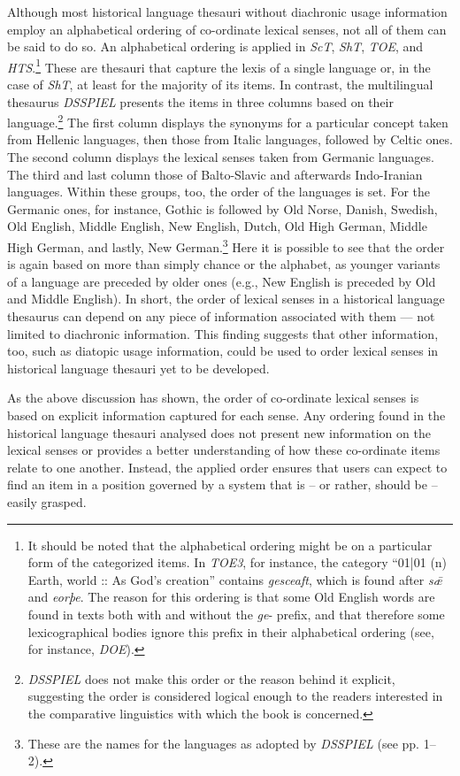 Although most historical language thesauri without diachronic usage information employ an alphabetical ordering of co-ordinate lexical senses, not all of them can be said to do so. An alphabetical ordering is applied in \textit{ScT}, \textit{ShT}, \textit{TOE}, and \textit{HTS}.\footnote{It should be noted that the alphabetical ordering might be on a particular form of the categorized items. In \textit{TOE3}, for instance, the category ``01|01 (n) Earth, world :: As God's creation'' contains \textit{gesceaft}, which is found after \textit{sǣ} and \textit{eorþe}. The reason for this ordering is that some Old English words are found in texts both with and without the \textit{ge}- prefix, and that therefore some lexicographical bodies ignore this prefix in their alphabetical ordering (see, for instance, \textit{DOE}).} These are thesauri that capture the lexis of a single language or, in the case of \textit{ShT}, at least for the majority of its items. In contrast, the multilingual thesaurus \textit{DSSPIEL} presents the items in three columns based on their language.\footnote{\textit{DSSPIEL} does not make this order or the reason behind it explicit, suggesting the order is considered logical enough to the readers interested in the comparative linguistics with which the book is concerned.} The first column displays the synonyms for a particular concept taken from Hellenic languages, then those from Italic languages, followed by Celtic ones. The second column displays the lexical senses taken from Germanic languages. The third and last column those of Balto-Slavic and afterwards Indo-Iranian languages. Within these groups, too, the order of the languages is set. For the Germanic ones, for instance, Gothic is followed by Old Norse, Danish, Swedish, Old English, Middle English, New English, Dutch, Old High German, Middle High German, and lastly, New German.\footnote{These are the names for the languages as adopted by \textit{DSSPIEL} (see pp. 1–2).} Here it is possible to see that the order is again based on more than simply chance or the alphabet, as younger variants of a language are preceded by older ones (e.g., New English is preceded by Old and Middle English). In short, the order of lexical senses in a historical language thesaurus can depend on any piece of information associated with them --- not limited to diachronic information. This finding suggests that other information, too, such as diatopic usage information, could be used to order lexical senses in historical language thesauri yet to be developed.

As the above discussion has shown, the order of co-ordinate lexical senses is based on explicit information captured for each sense. Any ordering found in the historical language thesauri analysed does not present new information on the lexical senses or provides a better understanding of how these co-ordinate items relate to one another. Instead, the applied order ensures that users can expect to find an item in a position governed by a system that is -- or rather, should be -- easily grasped.

